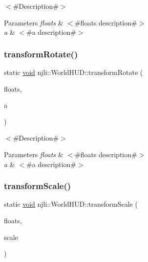$<$\#\+Description\#$>$


\begin{DoxyParams}{Parameters}
{\em floats} & $<$\#floats description\#$>$ \\
\hline
{\em a} & $<$\#a description\#$>$ \\
\hline
\end{DoxyParams}
\mbox{\label{classnjli_1_1_world_h_u_d_ab3b5c6780f1136e327b308197aba9908}} 
\subsubsection{\texorpdfstring{transform\+Rotate()}{transformRotate()}\hspace{0.1cm}{\footnotesize\ttfamily [2/2]}}
{\footnotesize\ttfamily static \mbox{\hyperlink{_thread_8h_af1e856da2e658414cb2456cb6f7ebc66}{void}} njli\+::\+World\+H\+U\+D\+::transform\+Rotate (\begin{DoxyParamCaption}\item[{\mbox{\hyperlink{_util_8h_a5f6906312a689f27d70e9d086649d3fd}{f32}} $\ast$}]{floats,  }\item[{\mbox{\hyperlink{_util_8h_a5f6906312a689f27d70e9d086649d3fd}{f32}}}]{a }\end{DoxyParamCaption})\hspace{0.3cm}{\ttfamily [static]}}

$<$\#\+Description\#$>$


\begin{DoxyParams}{Parameters}
{\em floats} & $<$\#floats description\#$>$ \\
\hline
{\em a} & $<$\#a description\#$>$ \\
\hline
\end{DoxyParams}
\mbox{\label{classnjli_1_1_world_h_u_d_a3bfccd760729d7c98a7e9e623cbcedc7}} 
\subsubsection{\texorpdfstring{transform\+Scale()}{transformScale()}\hspace{0.1cm}{\footnotesize\ttfamily [1/2]}}
{\footnotesize\ttfamily static \mbox{\hyperlink{_thread_8h_af1e856da2e658414cb2456cb6f7ebc66}{void}} njli\+::\+World\+H\+U\+D\+::transform\+Scale (\begin{DoxyParamCaption}\item[{bt\+Matrix3x3 \&}]{floats,  }\item[{const bt\+Vector2 \&}]{scale }\end{DoxyParamCaption})\hspace{0.3cm}{\ttfamily [static]}}


